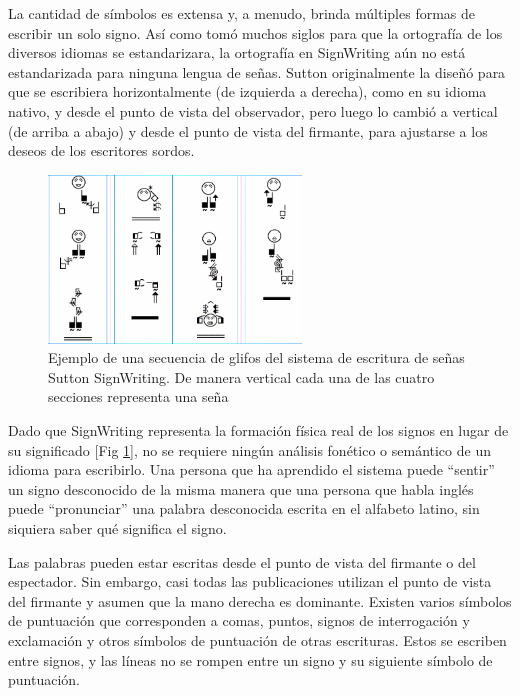 La cantidad de símbolos es extensa y, a menudo, brinda múltiples formas de escribir un solo signo. Así como tomó muchos siglos para que la ortografía de los diversos idiomas se estandarizara, la ortografía en SignWriting aún no está estandarizada para ninguna lengua de señas.
 Sutton originalmente la diseñó para que se escribiera horizontalmente (de izquierda a derecha), como en su idioma nativo, y desde el punto de vista del observador, pero luego lo cambió a vertical (de arriba a abajo) y desde el punto de vista del firmante, para ajustarse a los deseos de los escritores sordos.
 \begin{figure}[ht!]
    \centering
    \includegraphics[width=0.6\textwidth]{Graphics/arreglo_glifos_sutton.png}
    \caption{Ejemplo de una secuencia de glifos del sistema de escritura de señas Sutton SignWriting. De manera vertical cada una de las cuatro secciones representa una seña}
    \label{fig:arreglo_glifos_sutton}
\end{figure}
 
 Dado que SignWriting representa la formación física real de los signos en lugar de su significado [Fig \ref{fig:arreglo_glifos_sutton}], no se requiere ningún análisis fonético o semántico de un idioma para escribirlo. Una persona que ha aprendido el sistema puede ``sentir'' un signo desconocido de la misma manera que una persona que habla inglés puede ``pronunciar'' una palabra desconocida escrita en el alfabeto latino, sin siquiera saber qué significa el signo.

Las palabras pueden estar escritas desde el punto de vista del firmante o del espectador. Sin embargo, casi todas las publicaciones utilizan el punto de vista del firmante y asumen que la mano derecha es dominante. Existen varios símbolos de puntuación que corresponden a comas, puntos, signos de interrogación y exclamación y otros símbolos de puntuación de otras escrituras. Estos se escriben entre signos, y las líneas no se rompen entre un signo y su siguiente símbolo de puntuación.

